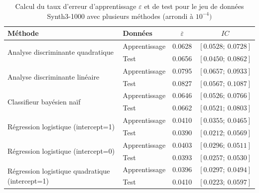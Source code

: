 \documentclass{article}
\begin{document}
\begin{table}[H]
\centering
\caption{Calcul du taux d'erreur d'apprentissage $\varepsilon$ et de test pour le jeu de données Synth3-1000 avec plusieurs méthodes (arrondi à $10^{-4})$}
\begin{tabular}{l|l|cc}
\multicolumn{1}{l|}{\textbf{Méthode}}    & \textbf{Données} &$ \overline{\varepsilon}$ & $IC$                      \\ \hline
\multirow{2}{*}{Analyse discriminante quadratique} & Apprentissage    & 0.0628                   & $\left[0.0528 ;~ 0.0728 \right]$  \\
                                       & Test             & 0.0656            & $\left[ 0.0450  ;~ 0.0862 \right]$ \\ \hline
\multirow{2}{*}{Analyse discriminante linéaire}                  & Apprentissage & 0.0795                               & $\left[0.0657 ;~ 0.0933 \right]$  \\
                                       & Test             &  0.0827                     & $\left[0.0567  ;~ 0.1087 \right]$ \\ \hline
\multirow{2}{*}{Classifieur bayésien naïf}                  & Apprentissage    & 0.0646                           & $\left[0.0526 ;~ 0.0766 \right]$  \\
                                       & Test             & 0.0662                             & $\left[ 0.0521 ;~ 0.0803 \right]$ \\ \hline
\multirow{2}{*}{Régression logistique (intercept=1)}                  & Apprentissage    & 0.0410                            & $\left[0.0355;~ 0.0465 \right]$  \\
                                       & Test             &0.0390                                & $\left[0.0212;~ 0.0569 \right]$ \\ \hline
\multirow{2}{*}{Régression logistique (intercept=0)}                  & Apprentissage    & 0.0403                            & $\left[0.0296 ;~ 0.0511\right]$  \\
                                       & Test             & 0.0393                                 & $\left[0.0257 ;~ 0.0530 \right]$ \\ \hline
\multirow{2}{*}{Régression logistique quadratique (intercept=1)}                  & Apprentissage    & 0.0396                            & $\left[0.0297 ;~ 0.0494 \right]$  \\
                                       & Test             & 0.0410                                & $\left[0.0223;~ 0.0597 \right]$ \\ \hline

\end{tabular}
\end{table}
\end{document}
